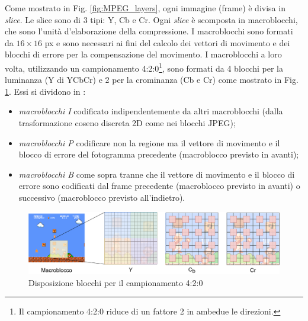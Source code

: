
Come mostrato in Fig. \ref{fig:MPEG_layers}, ogni immagine (frame) è divisa in \textit{slice}. Le slice sono di 3 tipi: Y, Cb e Cr. Ogni \textit{slice} è scomposta in macroblocchi, che sono l'unità d'elaborazione della compressione. I macroblocchi sono formati da $16\times16$ px e sono necessari ai fini del calcolo dei vettori di movimento e dei blocchi di errore per la compensazione del movimento. I macroblocchi a loro volta, utilizzando un campionamento 4:2:0\footnote{Il campionamento 4:2:0 riduce di un fattore 2 in ambedue le direzioni.}, sono formati da 4 blocchi per la luminanza (Y di YCbCr) e 2 per la crominanza (Cb e Cr) come mostrato in Fig. \ref{fig:macroblocchi}. Essi si dividono in \parencite{ProgettazioneEproduzioneMultimediale}:

\begin{itemize}
	\item \textit{macroblocchi I} codificato indipendentemente da altri macroblocchi (dalla trasformazione coseno discreta 2D come nei blocchi JPEG);
	\item \textit{macroblocchi P} codificare non la regione ma il vettore di movimento e il blocco di errore del fotogramma precedente (macroblocco previsto in avanti);
	\item \textit{macroblocchi B} come sopra tranne che il vettore di movimento e il blocco di errore sono codificati dal frame precedente (macroblocco previsto in avanti) o successivo (macroblocco previsto all'indietro).
\end{itemize}

\begin{figure}[H]
	\includegraphics[width=\linewidth]{immagini/macroblocchi}
	\centering
	\caption{Disposizione blocchi per il campionamento 4:2:0}
	\label{fig:macroblocchi}
\end{figure}

